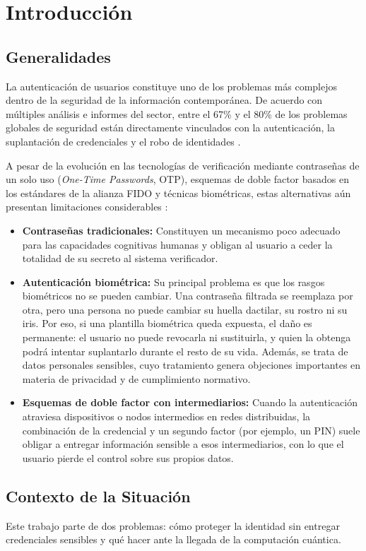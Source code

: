 \section{Introducción}

\subsection{Generalidades}
La autenticación de usuarios constituye uno de los problemas más complejos dentro de la seguridad de la información contemporánea. De acuerdo con múltiples análisis e informes del sector, entre el 67\% y el 80\% de los problemas globales de seguridad están directamente vinculados con la autenticación, la suplantación de credenciales y el robo de identidades \cite{identity_mfa}.

A pesar de la evolución en las tecnologías de verificación mediante contraseñas de un solo uso (\textit{One-Time Passwords}, OTP), esquemas de doble factor basados en los estándares de la alianza FIDO y técnicas biométricas, estas alternativas aún presentan limitaciones considerables \cite{fido_alliance}:
\begin{itemize}
    \item \textbf{Contraseñas tradicionales:} Constituyen un mecanismo poco adecuado para las capacidades cognitivas humanas y obligan al usuario a ceder la totalidad de su secreto al sistema verificador.
    \item \textbf{Autenticación biométrica:} Su principal problema es que los rasgos biométricos no se pueden cambiar. Una contraseña filtrada se reemplaza por otra, pero una persona no puede cambiar su huella dactilar, su rostro ni su iris. Por eso, si una plantilla biométrica queda expuesta, el daño es permanente: el usuario no puede revocarla ni sustituirla, y quien la obtenga podrá intentar suplantarlo durante el resto de su vida. Además, se trata de datos personales sensibles, cuyo tratamiento genera objeciones importantes en materia de privacidad y de cumplimiento normativo.
    \item \textbf{Esquemas de doble factor con intermediarios:} Cuando la autenticación atraviesa dispositivos o nodos intermedios en redes distribuidas, la combinación de la credencial y un segundo factor (por ejemplo, un PIN) suele obligar a entregar información sensible a esos intermediarios, con lo que el usuario pierde el control sobre sus propios datos.
\end{itemize}

\subsection{Contexto de la Situación}
Este trabajo parte de dos problemas: cómo proteger la identidad sin entregar credenciales sensibles y qué hacer ante la llegada de la computación cuántica.

